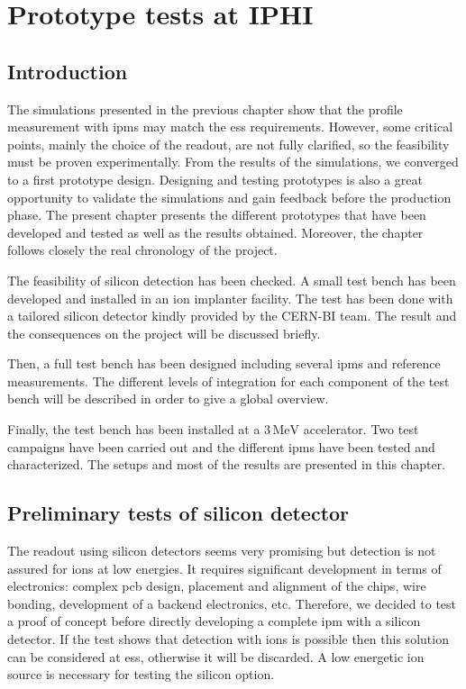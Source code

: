 \chapter{Prototype tests at IPHI}
\cleardoublepage
\minitoc
\section{Introduction}
\begin{refsection}
  \label{ch4:Introduction}
  The simulations presented in the previous chapter show that the profile measurement with \acrshort{ipm}s may match the \acrshort{ess} requirements. However, some critical points, mainly the choice of the readout, are not fully clarified, so the feasibility must be proven experimentally. From the results of the simulations, we converged to a first prototype design. Designing and testing prototypes is also a great opportunity to validate the simulations and gain feedback before the production phase. The present chapter presents the different prototypes that have been developed and tested as well as the results obtained. Moreover, the chapter follows closely the real chronology of the project.

  The feasibility of silicon detection has been checked. A small test bench has been developed and installed in an ion implanter facility. The test has been done with a tailored silicon detector kindly provided by the CERN-BI team. The result and the consequences on the project will be discussed briefly.

  Then, a full test bench has been designed including several \acrshort{ipm}s and reference measurements. The different levels of integration for each component of the test bench will be described in order to give a global overview.

  Finally, the test bench has been installed at a $3\,\mathrm{MeV}$ accelerator. Two test campaigns have been carried out and the different \acrshort{ipm}s have been tested and characterized. The setups and most of the results are presented in this chapter.

  \section{Preliminary tests of silicon detector}
  The readout using silicon detectors seems very promising but detection is not assured for ions at low energies. It requires significant development in terms of electronics: complex \acrshort{pcb} design, placement and alignment of the chips, wire bonding, development of a backend electronics, etc. Therefore, we decided to test a proof of concept before directly developing a complete \acrshort{ipm} with a silicon detector. If the test shows that detection with ions is possible then this solution can be considered at \acrshort{ess}, otherwise it will be discarded. A low energetic ion source is necessary for testing the silicon option.


\end{refsection}
